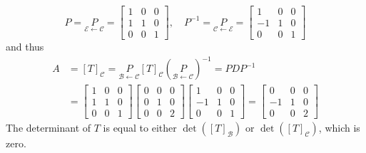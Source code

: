 \documentclass{beamer}
\theoremstyle{definition}
\theoremstyle{remark}
\begin{document}
\begin{frame}[t]
\begin{example}
\[
P=\underset{\mathcal E\leftarrow\mathcal C}{P}=\begin{bmatrix}
1&0&0\\
1&1&0\\
0&0&1
\end{bmatrix},\quad P^{-1}=\underset{\mathcal C\leftarrow\mathcal E}{P}=\begin{bmatrix}
1&0&0\\
-1&1&0\\
0&0&1
\end{bmatrix}
\]
and thus\pause
\begin{align*}
A&=[T]_{\mathcal C}=\underset{\mathcal B\leftarrow\mathcal C}{P}[T]_{\mathcal C}\left(\underset{\mathcal B\leftarrow\mathcal C}{P}\right)^{-1}=PDP^{-1}\\
&=\begin{bmatrix}
1&0&0\\
1&1&0\\
0&0&1
\end{bmatrix}\begin{bmatrix}
0&0&0\\
0&1&0\\
0&0&2
\end{bmatrix}\begin{bmatrix}
1&0&0\\
-1&1&0\\
0&0&1
\end{bmatrix}=\begin{bmatrix}
0&0&0\\
-1&1&0\\
0&0&2
\end{bmatrix}
\end{align*}\pause
The determinant of $T$ is equal to either $\det([T]_{\mathcal B})$ or $\det([T]_{\mathcal C})$, which is zero.
\end{example}
\end{frame}
\end{document}
